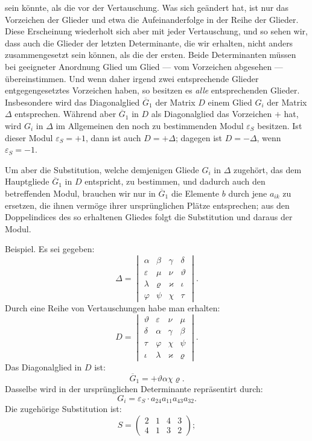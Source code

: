 \documentclass[11pt]{article}
\providecommand{\weberpage}[1]{}
\begin{document}
\weberpage{27}
sein k\"onnte, als die vor der Vertauschung. Was sich ge\"andert hat, ist nur das Vorzeichen der Glieder und etwa die Aufeinanderfolge in der Reihe der Glieder. Diese Erscheinung wiederholt sich aber mit jeder Vertauschung, und so sehen wir, dass auch die Glieder der letzten Determinante, die wir erhalten, nicht anders zusammengesetzt sein k\"onnen, als die der ersten. Beide Determinanten m\"ussen bei geeigneter Anordnung Glied um Glied --- vom Vorzeichen abgesehen --- \"ubereinstimmen. Und wenn daher irgend zwei entsprechende Glieder entgegengesetztes Vorzeichen haben, so besitzen es \textit{alle} entsprechenden Glieder. Insbesondere wird das Diagonalglied $\overline{G}_1$ der Matrix $D$ einem Glied $G_i$ der Matrix $\varDelta$ entsprechen. W\"ahrend aber $\overline{G}_1$ in $D$ als Diagonalglied das Vorzeichen $+$ hat, wird $G_i$ in $\varDelta$ im Allgemeinen den noch zu bestimmenden Modul $\varepsilon_S$ besitzen. Ist dieser Modul $\varepsilon_S = + 1$, dann ist auch $D = + \varDelta$; dagegen ist $D = - \varDelta$, wenn $\varepsilon_S = - 1$.

Um aber die Substitution, welche demjenigen Gliede $G_i$ in $\varDelta$ zugeh\"ort, das dem Hauptgliede $\overline{G}_1$ in $D$ entspricht, zu bestimmen, und dadurch auch den betreffenden Modul, brauchen wir nur in $\overline{G}_1$ die Elemente $b$ durch jene $a_{ik}$ zu ersetzen, die ihnen verm\"oge ihrer urspr\"unglichen Pl\"atze entsprechen; aus den Doppelindices des so erhaltenen Gliedes folgt die Substitution und daraus der Modul.

Beispiel. Es sei gegeben:
\[
\varDelta = \begin{vmatrix} \alpha & \beta & \gamma & \delta \\ \varepsilon & \mu & \nu & \vartheta \\ \lambda & \varrho & \varkappa & \iota \\ \varphi & \psi & \chi & \tau \end{vmatrix}.
\]
Durch eine Reihe von Vertauschungen habe man erhalten:
\[
D = \begin{vmatrix} \vartheta & \varepsilon & \nu & \mu \\ \delta & \alpha & \gamma & \beta \\ \tau & \varphi & \chi & \psi \\ \iota & \lambda & \varkappa & \varrho \end{vmatrix}.
\]
Das Diagonalglied in $D$ ist:
\[
\overline{G}_1 = + \vartheta \alpha \chi \varrho.
\]
Dasselbe wird in der urspr\"unglichen Determinante repr\"asentirt durch:
\[
G_i = \varepsilon_S \cdot a_{24} a_{11} a_{43} a_{32}.
\]
Die zugeh\"orige Substitution ist:
\[
S = \begin{pmatrix} 2 & 1 & 4 & 3 \\ 4 & 1 & 3 & 2 \end{pmatrix};
\]
\end{document}
